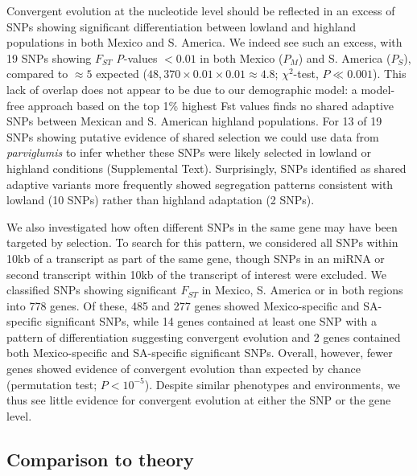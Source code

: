 Convergent evolution at the nucleotide level should be reflected in an excess of SNPs showing significant differentiation between lowland and highland populations in both Mexico and S. America. 
We indeed see such an excess, with 19 SNPs showing $F_{ST}$ \emph{P}-values  $<0.01$ in both Mexico ($P_M$) and S. America ($P_S$), compared to $\approx 5$ expected ($48,370\times 0.01 \times 0.01 \approx 4.8$; $\chi^2$-test, $P\ll0.001$). 
This lack of overlap does not appear to be due to our demographic model: a model-free approach based on the top 1\% highest Fst values finds no shared adaptive SNPs between Mexican and S. American highland populations. 
For 13 of 19 SNPs showing putative evidence of shared selection we could use data from \textit{parviglumis} to infer whether these SNPs were likely selected in lowland or highland conditions (Supplemental Text).  
Surprisingly, SNPs identified as shared adaptive variants more frequently showed segregation patterns consistent with lowland  (10 SNPs) rather than highland adaptation (2 SNPs). %

We also investigated how often different SNPs in the same gene may have been targeted by selection. 
To search for this pattern, we considered all SNPs within 10kb of a transcript as part of the same gene, though SNPs in an miRNA or second transcript within 10kb of the transcript of interest were excluded.  
We classified SNPs showing significant $F_{ST}$ in Mexico, S. America or in both regions into 778 genes. 
Of these, 485 and 277 genes showed Mexico-specific and SA-specific significant SNPs, while 14 genes contained at least one SNP with a pattern of differentiation suggesting convergent evolution and 2 genes contained both Mexico-specific and SA-specific significant SNPs. 
Overall, however, fewer genes showed evidence of convergent evolution than expected by chance (permutation test; $P<10^{-5}$). 
Despite similar phenotypes and environments, we thus see little evidence for convergent evolution at either the SNP or the gene level.  

\subsection*{Comparison to theory}


